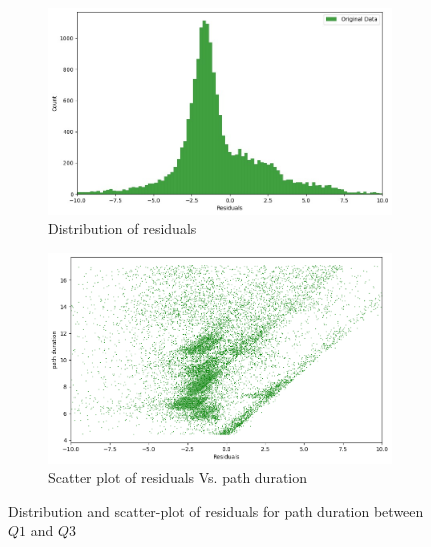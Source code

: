 \documentclass[12pt]{article}
\begin{document}
\FloatBarrier
\begin{figure}[ht]
  \centering
  \begin{subfigure}{0.48\textwidth}
    \includegraphics[width=\linewidth]{Q1_Q3 distribution.jpg}
    \caption{Distribution of residuals}
    \label{fig:Distribution of residuals for path duration between Q1 and Q3}
  \end{subfigure}
  \hfill
  \begin{subfigure}{0.48\textwidth}
    \includegraphics[width=\linewidth]{Q1_Q3 residuals path duration.png}
    \caption{Scatter plot of residuals Vs. path duration}
    \label{fig:Scatter plot of residuals Vs. path duration (Q1 < time duration < Q3)}
  \end{subfigure}
  \caption{Distribution and scatter-plot of residuals for path duration between $Q1$ and $Q3$}
  \label{fig:Distribution and scatter-plot of residuals for path duration between $Q1$ and $Q3$}
\end{figure}
\end{document}

